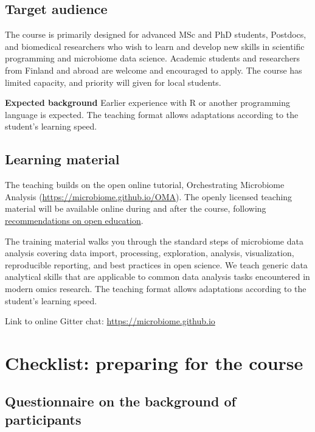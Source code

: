 \documentclass[
  oneside]{book}
\begin{document}
\hypertarget{target-audience}{%
\section{Target audience}\label{target-audience}}

The course is primarily designed for advanced MSc and PhD students,
Postdocs, and biomedical researchers who wish to learn and develop new
skills in scientific programming and microbiome data science.
Academic students and researchers from Finland and abroad are welcome
and encouraged to apply. The course has limited capacity, and priority
will given for local students.

\textbf{Expected background} Earlier experience with R or another
programming language is expected. The teaching format allows
adaptations according to the student's learning speed.

\hypertarget{learning-material}{%
\section{Learning material}\label{learning-material}}

The teaching builds on the open online tutorial, Orchestrating
Microbiome Analysis (\url{https://microbiome.github.io/OMA}). The openly
licensed teaching material will be available online during and after
the course, following \href{https://edition.fi/tsv/catalog/book/421}{recommendations on open education}.

The training material walks you through the standard steps of
microbiome data analysis covering data import, processing,
exploration, analysis, visualization, reproducible reporting, and best
practices in open science. We teach generic data analytical skills
that are applicable to common data analysis tasks encountered in
modern omics research. The teaching format allows adaptations
according to the student's learning speed.

Link to online Gitter chat:
\url{https://microbiome.github.io}

\hypertarget{checklist-preparing-for-the-course}{%
\chapter{Checklist: preparing for the course}\label{checklist-preparing-for-the-course}}

\hypertarget{questionnaire-on-the-background-of-participants}{%
\section{Questionnaire on the background of participants}\label{questionnaire-on-the-background-of-participants}}
\end{document}

